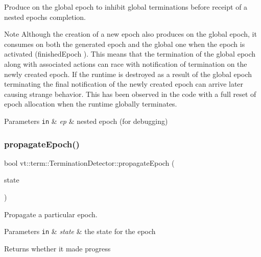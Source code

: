 Produce on the global epoch to inhibit global terminations before receipt of a nested epoch\textquotesingle{}s completion. 

\begin{DoxyNote}{Note}
Although the creation of a new epoch also produces on the global epoch, it consumes on both the generated epoch and the global one when the epoch is activated ({\ttfamily finished\+Epoch} ). This means that the termination of the global epoch along with associated actions can race with notification of termination on the newly created epoch. If the runtime is destroyed as a result of the global epoch terminating the final notification of the newly created epoch can arrive later causing strange behavior. This has been observed in the code with a full reset of epoch allocation when the runtime globally terminates.
\end{DoxyNote}

\begin{DoxyParams}[1]{Parameters}
\mbox{\tt in}  & {\em ep} & nested epoch (for debugging) \\
\hline
\end{DoxyParams}
\mbox{\label{structvt_1_1term_1_1_termination_detector_a8f39f31278d42572260d09fb4c72aceb}} 
\subsubsection{\texorpdfstring{propagate\+Epoch()}{propagateEpoch()}}
{\footnotesize\ttfamily bool vt\+::term\+::\+Termination\+Detector\+::propagate\+Epoch (\begin{DoxyParamCaption}\item[{\hyperlink{structvt_1_1term_1_1_term_action_ae4c635b69751d887666814700ed64d65}{Term\+State\+Type} \&}]{state }\end{DoxyParamCaption})\hspace{0.3cm}{\ttfamily [private]}}



Propagate a particular epoch. 


\begin{DoxyParams}[1]{Parameters}
\mbox{\tt in}  & {\em state} & the state for the epoch\\
\hline
\end{DoxyParams}
\begin{DoxyReturn}{Returns}
whether it made progress 
\end{DoxyReturn}
\mbox{\label{structvt_1_1term_1_1_termination_detector_a580b7ba3727a7358125cf217e9dcab19}} 
